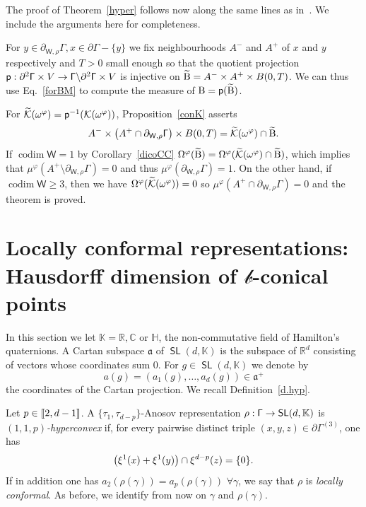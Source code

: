 \documentclass[AHL,Unicode,longabstracts,MathTools]{cedram}
\DeclareMathOperator{\codim}{codim}
\newcommand{\rmB}{\mathrm{B}}
\newcommand{\cartan}{a}
\DeclareMathOperator{\SL}{{\mathsf{SL}}}
\newcommand{\scr}{\mathscr}
\newcommand{\hol}{\scr{b}}
\renewcommand{\sf}[1]{{\mathsf{#1}}}
\newcommand{\G}{\sf{\Gamma}}
\newcommand{\cal}{\mathcal}
\newcommand{\R}{\mathbb{R}}
\newcommand{\C}{\mathbb{C}}
\renewcommand{\H}{\mathbb{H}}
\newcommand{\K}{\mathbb{K}}
\newcommand{\g}{\gamma}
\newcommand{\bord}{\partial}
\newcommand{\BM}{\Omega}
\newcommand{\df}{\omega}
\newcommand{\slroot}{{\tau}}
\renewcommand{\/}{\backslash}
\newcommand{\<}{\langle}
\renewcommand{\>}{\rangle}
\renewcommand{\a}{\mathfrak{a}}
\renewcommand*{\to}{\mathchoice{\longrightarrow}{\rightarrow}{\rightarrow}{\rightarrow}}
\let\originalleft\left
\let\originalright\right
\renewcommand{\left}{\mathopen{}\mathclose\bgroup\originalleft}
\renewcommand{\right}{\aftergroup\egroup\originalright}
\let\oldtilde\tilde
\renewcommand*{\tilde}[1]{\mathchoice{\widetilde{#1}}{\widetilde{#1}}{\oldtilde{#1}}{\oldtilde{#1}}}
\let\oldforall\forall
\renewcommand*{\forall}{\mathrel{\oldforall}}
\newcommand{\llbracket}{\mathopen{[\mkern -2.7mu[}}
\newcommand{\rrbracket}{\mathclose{]\mkern -2.7mu]}}
\newcommand{\lb}{\llbracket}
\newcommand{\rb}{\rrbracket}
\begin{document}
The proof of Theorem~\ref{hyper} follows now along the same lines as in~\cite[Theorem~5.13.3]{dichotomy}. We include the arguments here for completeness.

For $y\in\bord_{\sf W,\rho}\G, x\in\bord\G-\{y\}$ we fix neighbourhoods $A^-$ and $A^+$ of $x$ and $y$ respectively and $T>0$ small enough so that the quotient projection $\sf p:\bord^2\G\times V\to\G\backslash\bord^2\G\times V$ is injective on $\tilde{\rmB}=A^-\times A^+\times B(0,T)$. We can thus use Eq.~\eqref{forBM} to compute the measure of $\rmB=\sf p(\tilde{\rmB})$.

For $\tilde{\cal K}({\df}^\varphi)=\sf p^{-1}(\cal K({\df}^\varphi))$, Proposition~\ref{conK} asserts
\[
A^-\times\left(A^+\cap\bord_{\sf W,\rho}\G\right)\times B(0,T)=\tilde{\cal K}\left({\df}^\varphi\right)\cap\tilde{\rmB}.
\]
If $\codim \sf W=1$ by Corollary~\ref{dicoCC} $\BM^\varphi(\tilde{\rmB})=\BM^\varphi(\tilde{\cal K}({\df}^\varphi)\cap\tilde{\rmB})$, which implies that $\mu^\varphi(A^+\setminus\bord_{\sf W,\rho}\G)=0$ and thus $\mu^\varphi(\bord_{\sf W,\rho}\G)=1$. On the other hand, if $\codim\sf W\geq3$, then we have $\BM^\varphi(\tilde{\cal K}({\df}^\varphi))=0$ so $\mu^\varphi(A^+\cap\bord_{\sf W,\rho}\G)=0$ and the theorem is proved.



\section{Locally conformal representations: Hausdorff dimension of \texorpdfstring{$\hol$}{hol}-conical points}\label{s.Hffbcon}
In this section we let $\K=\R, \C$ or $\H$, the non-commutative field of Hamilton's quaternions. A Cartan subspace $\a$ of $\SL(d,\K)$ is the subspace of $\R^d$ consisting of vectors whose coordinates sum 0. For $g\in\SL(d,\K)$ we denote by
\[
\cartan(g)=(\cartan_1(g),\dots,\cartan_d(g))\in\a^+
\]
the coordinates of the Cartan projection. We recall Definition~\ref{d.hyp}.

\begin{defi}\label{locConf}
Let $p\in\lb2,d-1\rb$. A $\{\slroot_1,\slroot_{d-p}\}$-Anosov representation $\rho:\G\to\SL(d,\K)$ is \emph{$(1,1,p)$-hyperconvex} if, for every pairwise distinct triple $(x,y,z)\in\bord\G^{(3)}$, one has
\[
\left(\xi^1(x)+\xi^1(y)\right)\cap\xi^{d-p}(z)=\{0\}.
\]
If in addition one has $\cartan_2(\rho(\g))=\cartan_p(\rho(\g))$ $\forall\g$, we say that $\rho$ is \emph{locally conformal}. As before, we identify from now on $\g$ and $\rho(\g)$.
\end{defi}
\end{document}

